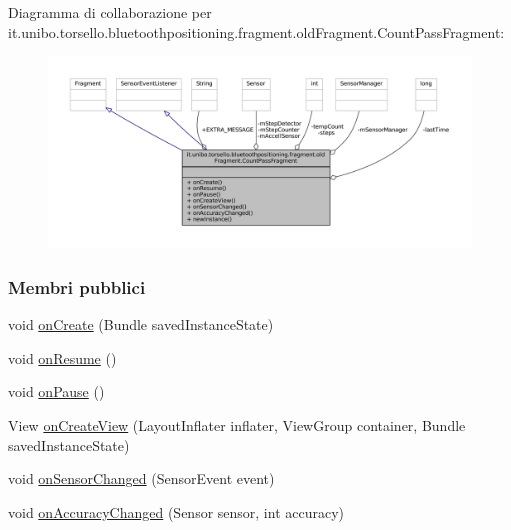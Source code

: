 Diagramma di collaborazione per it.\+unibo.\+torsello.\+bluetoothpositioning.\+fragment.\+old\+Fragment.\+Count\+Pass\+Fragment\+:
\nopagebreak
\begin{figure}[H]
\begin{center}
\leavevmode
\includegraphics[width=350pt]{classit_1_1unibo_1_1torsello_1_1bluetoothpositioning_1_1fragment_1_1oldFragment_1_1CountPassFragment__coll__graph}
\end{center}
\end{figure}
\subsubsection*{Membri pubblici}
\begin{DoxyCompactItemize}
\item 
void \hyperlink{classit_1_1unibo_1_1torsello_1_1bluetoothpositioning_1_1fragment_1_1oldFragment_1_1CountPassFragment_a4f5121d2c3b4d4efb1b55d753c71a4c4_a4f5121d2c3b4d4efb1b55d753c71a4c4}{on\+Create} (Bundle saved\+Instance\+State)
\item 
void \hyperlink{classit_1_1unibo_1_1torsello_1_1bluetoothpositioning_1_1fragment_1_1oldFragment_1_1CountPassFragment_a369686c1b5124f946ba06148563a33fe_a369686c1b5124f946ba06148563a33fe}{on\+Resume} ()
\item 
void \hyperlink{classit_1_1unibo_1_1torsello_1_1bluetoothpositioning_1_1fragment_1_1oldFragment_1_1CountPassFragment_afae67ea2360d6a57e1e6bb3a1a8f2d83_afae67ea2360d6a57e1e6bb3a1a8f2d83}{on\+Pause} ()
\item 
View \hyperlink{classit_1_1unibo_1_1torsello_1_1bluetoothpositioning_1_1fragment_1_1oldFragment_1_1CountPassFragment_a2c7d7b72b37f42ab65321dba532d10cb_a2c7d7b72b37f42ab65321dba532d10cb}{on\+Create\+View} (Layout\+Inflater inflater, View\+Group container, Bundle saved\+Instance\+State)
\item 
void \hyperlink{classit_1_1unibo_1_1torsello_1_1bluetoothpositioning_1_1fragment_1_1oldFragment_1_1CountPassFragment_a278dd4ec68b222361517aed048efea68_a278dd4ec68b222361517aed048efea68}{on\+Sensor\+Changed} (Sensor\+Event event)
\item 
void \hyperlink{classit_1_1unibo_1_1torsello_1_1bluetoothpositioning_1_1fragment_1_1oldFragment_1_1CountPassFragment_a6e43aa183aa10d77db7129375cc9d487_a6e43aa183aa10d77db7129375cc9d487}{on\+Accuracy\+Changed} (Sensor sensor, int accuracy)
\end{DoxyCompactItemize}
